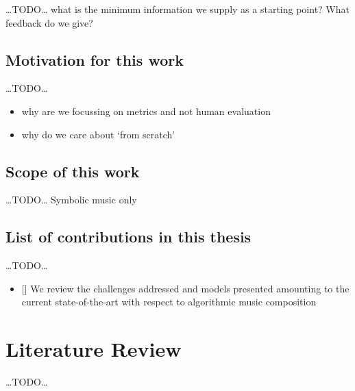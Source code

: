 \documentclass[12pt,a4paper,]{report}
\providecommand{\tightlist}{%
  \setlength{\itemsep}{0pt}\setlength{\parskip}{0pt}}
\begin{document}
\ldots TODO\ldots{} what is the minimum information we supply as a
starting point? What feedback do we give?

\hypertarget{motivation-for-this-work}{%
\section{Motivation for this work}\label{motivation-for-this-work}}

\ldots TODO\ldots{}

\begin{itemize}
\tightlist
\item
  why are we focussing on metrics and not human evaluation
\item
  why do we care about `from scratch'
\end{itemize}

\hypertarget{scope-of-this-work}{%
\section{Scope of this work}\label{scope-of-this-work}}

\ldots TODO\ldots{} Symbolic music only

\hypertarget{list-of-contributions-in-this-thesis}{%
\section{List of contributions in this
thesis}\label{list-of-contributions-in-this-thesis}}

\ldots TODO\ldots{}

\begin{itemize}
\tightlist
\item
  {[}{]} We review the challenges addressed and models presented
  amounting to the current state-of-the-art with respect to algorithmic
  music composition
\end{itemize}

\hypertarget{literature-review}{%
\chapter{Literature Review}\label{literature-review}}

\ldots TODO\ldots{}
\end{document}
